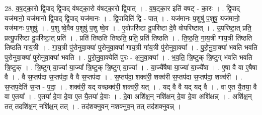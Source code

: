 \documentclass[17pt]{extarticle}
\begin{document}
28. व॒ष॒ट्का॒रो द्वि॒पाद् द्वि॒पाद् व॑षट्का॒रो व॑षट्का॒रो द्वि॒पात् । . व॒ष॒ट्का॒र इति॑ वषट् - का॒रः । . द्वि॒पाद् यज॑मानो॒ यज॑मानो द्वि॒पाद् द्वि॒पाद् यज॑मानः । . द्वि॒पादिति॑ द्वि - पात् । . यज॑मानः प॒शुषु॑ प॒शुषु॒ यज॑मानो॒ यज॑मानः प॒शुषु॑ । . प॒शु ष्वे॒वैव प॒शुषु॑ प॒शु ष्वे॒व । . ए॒वोपरि॑ष्टा दु॒परि॑ष्टा दे॒वै वोपरि॑ष्टात् । . उ॒परि॑ष्टा॒त् प्रति॒ प्रत्यु॒परि॑ष्टा दु॒परि॑ष्टा॒त् प्रति॑ । . प्रति॑ तिष्ठति तिष्ठति॒ प्रति॒ प्रति॑ तिष्ठति । . ति॒ष्ठ॒ति॒ गा॒य॒त्री गा॑य॒त्री ति॑ष्ठति तिष्ठति गाय॒त्री । . गा॒य॒त्री पु॑रोनुवा॒क्या॑ पुरोनुवा॒क्या॑ गाय॒त्री गा॑य॒त्री पु॑रोनुवा॒क्या᳚ । . पु॒रो॒नु॒वा॒क्या॑ भवति भवति पुरोनुवा॒क्या॑ पुरोनुवा॒क्या॑ भवति । . पु॒रो॒नु॒वा॒क्येति॑ पुरः - अ॒नु॒वा॒क्या᳚ । . भ॒व॒ति॒ त्रि॒ष्टुक् त्रि॒ष्टुग् भ॑वति भवति त्रि॒ष्टुक् । . त्रि॒ष्टुग् या॒ज्या॑ या॒ज्या᳚ त्रि॒ष्टुक् त्रि॒ष्टुग् या॒ज्या᳚ । . या॒ज्यै॑षैषा या॒ज्या॑ या॒ज्यै॑षा । . ए॒षा वै वा ए॒षैषा वै । . वै स॒प्तप॑दा स॒प्तप॑दा॒ वै वै स॒प्तप॑दा । . स॒प्तप॑दा॒ शक्व॑री॒ शक्व॑री स॒प्तप॑दा स॒प्तप॑दा॒ शक्व॑री । . स॒प्तप॒देति॑ स॒प्त - प॒दा॒ । . शक्व॑री॒ यद् यच्छक्व॑री॒ शक्व॑री॒ यत् । . यद् वै वै यद् यद् वै । . वा ए॒त यै॒तया॒ वै वा ए॒तया᳚ । . ए॒तया॑ दे॒वा दे॒वा ए॒त यै॒तया॑ दे॒वाः । . दे॒वा अशि॑क्ष॒न् नशि॑क्षन् दे॒वा दे॒वा अशि॑क्षन्न् । . अशि॑क्ष॒न् तत् तदशि॑क्ष॒न् नशि॑क्ष॒न् तत् । . तद॑शक्नुवन् नशक्नुव॒न् तत् तद॑शक्नुवन्न् । \newline
\end{document}
